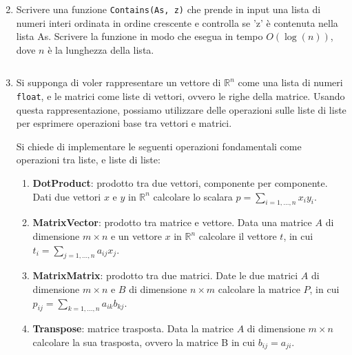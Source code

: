\documentclass[11pt,a4]{article}
\newcommand{\mybox}[2]{$\quad$\fbox{
\begin{minipage}{#1cm}
\hfill\vspace{#2cm}
\end{minipage}
}}
\begin{document}
\begin{enumerate}
\mybox{15}{2.75}

\item Scrivere una funzione {\tt Contains(As, z)} che prende in input una lista di numeri interi ordinata in ordine crescente
e controlla se 'z' è contenuta nella lista As. Scrivere la funzione in modo che esegua in tempo $O(\log(n))$, dove
$n$ è la lunghezza della lista.

\mybox{15}{2.75}


\item Si supponga di voler rappresentare un vettore di $\mathbb{R}^n$ come una lista di numeri {\tt float},
e le matrici come liste di vettori, ovvero le righe della matrice.
Usando questa rappresentazione, possiamo utilizzare delle operazioni sulle liste di liste per esprimere
operazioni base tra vettori e matrici. 

Si chiede di implementare le seguenti operazioni fondamentali come operazioni tra liste, e liste di liste:

\begin{enumerate}
\item {\bf DotProduct}: prodotto tra due vettori, componente per componente. Dati due vettori $x$ e $y$ in $\mathbb{R}^n$
calcolare lo scalara $p=\sum_{i = 1,\dots,n} x_i y_i$.
\item {\bf MatrixVector}: prodotto tra matrice e vettore. Data una matrice $A$ di dimensione $m \times n$ e un vettore $x$ in $\mathbb{R}^n$ calcolare il vettore $t$, in cui $t_i=\sum_{j = 1,\dots,n} a_{ij} x_j$.
\item {\bf MatrixMatrix}: prodotto tra due matrici. Date le due matrici $A$ di dimensione $m \times n$ e $B$ di dimensione $n \times m$ calcolare la matrice $P$, in cui $p_{ij}=\sum_{k = 1,\dots,n} a_{ik} b_{kj}$.
\item {\bf Transpose}: matrice trasposta. Data la matrice $A$ di dimensione $m \times n$ calcolare la sua trasposta,
ovvero la matrice B in cui $b_{ij} = a_{ji}$.

\end{enumerate}

\mybox{15}{8}


\end{enumerate}
\end{document}
